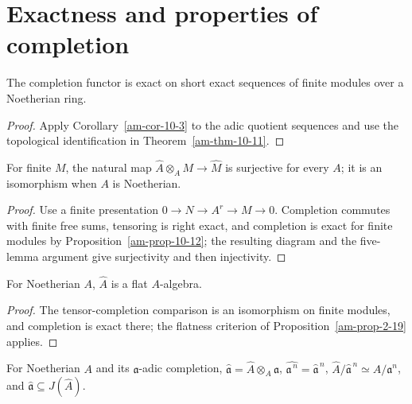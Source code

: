 \section{Exactness and properties of completion}
\label{am-ch10-exact-completion}
\begin{proposition}
\label{am-prop-10-12}
\uses{}
The completion functor is exact on short exact sequences of finite modules over
a Noetherian ring.
\end{proposition}
\begin{proof}
Apply Corollary~\ref{am-cor-10-3} to the adic quotient sequences and use the
topological identification in Theorem~\ref{am-thm-10-11}.
\end{proof}
\begin{proposition}
\label{am-prop-10-13}
\uses{}
For finite $M$, the natural map $\widehat A\otimes_A M\to\widehat M$ is
surjective for every $A$; it is an isomorphism when $A$ is Noetherian.
\end{proposition}
\begin{proof}
Use a finite presentation $0\to N\to A^r\to M\to0$.  Completion commutes
with finite free sums, tensoring is right exact, and completion is exact for
finite modules by Proposition~\ref{am-prop-10-12}; the resulting diagram and
the five-lemma argument give surjectivity and then injectivity.
\end{proof}
\begin{proposition}
\label{am-prop-10-14}
\uses{}
For Noetherian $A$, $\widehat A$ is a flat $A$-algebra.
\end{proposition}
\begin{proof}
The tensor-completion comparison is an isomorphism on finite modules, and
completion is exact there; the flatness criterion of Proposition~\ref{am-prop-2-19}
applies.
\end{proof}
\begin{proposition}
\label{am-prop-10-15}
\uses{}
For Noetherian $A$ and its $\mathfrak{a}$-adic completion,
$\widehat{\mathfrak{a}}=\widehat A\otimes_A\mathfrak{a}$,
$\widehat{\mathfrak{a}^{\,n}}=\widehat{\mathfrak{a}}^{\,n}$,
$\widehat A/\widehat{\mathfrak{a}}^{\,n}\simeq A/\mathfrak{a}^n$, and
$\widehat{\mathfrak{a}}\subseteq J(\widehat A)$.
\end{proposition}
